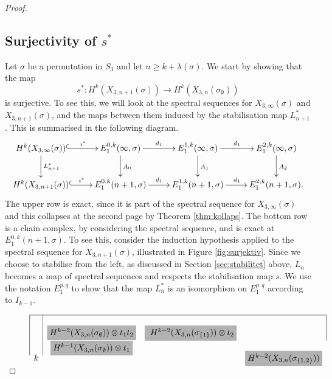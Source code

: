 \begin{proof}
  
  
  \subsection{Surjectivity of $s^*$}
  
  Let $\sigma$ be a permutation in $S_3$ and let $n \geq k +
  \lambda(\sigma)$. We start by showing that the map
  \[ s^* : H^k(X_{3,n+1}(\sigma)) \to
  H^k(X_{3,n}(\sigma_{\emptyset})) \] 
  is surjective.
  To see this, we will look at the spectral sequences for
  $X_{3,\infty}(\sigma)$ and $X_{3,n+1}(\sigma)$, and the maps between
  them induced by the stabilisation map $L^*_{n+1}$. This is
  summarised in the following diagram.
  \[ \xymatrix{ H^k(X_{3,\infty}(\sigma))
    \ar@{^(->}[r]^-{\imath^*}\ar[d]^{L^*_{n+1}} & E_1^{0,k}(\infty,\sigma)
    \ar[r]^{d_1}\ar[d]^{A_0} & 
    E_1^{1,k}(\infty,\sigma) \ar[r]^{d_1}\ar[d]^{A_1} &
    E_1^{2,k}(\infty,\sigma) \ar[d]^{A_2} \\
     H^k(X_{3,n+1}(\sigma)) \ar@{^(->}[r]^-{\imath^*} &
    E_1^{0,k}(n+1,\sigma) \ar[r]^{d_1} & E_1^{1,k}(n+1,\sigma)
    \ar[r]^{d_1} & E_1^{2,k}(n+1,\sigma).
  } \]
  The upper row is exact, since it is part of the spectral sequence for
  $X_{3,\infty}(\sigma)$ and this collapses at the second page by
  Theorem \ref{thm:kollaps}. The
  bottom row is a chain complex, by considering the spectral sequence,
  and is exact at
  $E_1^{0,k}(n+1,\sigma)$. To see this, consider the induction
  hypothesis applied to the spectral sequence for $X_{3,n+1}(\sigma)$,
  illustrated in Figure \ref{fig:surjektiv}. Since we choose to
  stabilise from the left,
  as discussed in Section \ref{sec:stabilitet} above, $L_n$
  becomes a map of spectral sequences and respects the stabilisation map
  $s$. We use the notation \colorbox{isomorphism}{$E_1^{p,q}$} to show
  that the map $L_n^*$ is an isomorphism on $E_1^{p,q}$ according to
  $I_{k-1}$. 
  \begin{figure}[ht]
    \[ 
    \begin{array}{|c|ccc|}
      \hline 
      &
      &
      &
      \\
      \multirow{6}{*}{$k$} 
      & \colorbox{isomorphism}{$H^{k-2}(X_{3,n}(\sigma_{\emptyset}))
        \otimes t_1t_2 $}
      & \colorbox{isomorphism}{ $H^{k-2}(X_{3,n}(\sigma_{\set{1}}))
        \otimes t_2 $}
      & \multirow{6}{*}{\colorbox{isomorphism}{$
        H^{k-2}(X_{3,n}(\sigma_{\set{1,2}}))$}} \\
      & \colorbox{isomorphism}{$H^{k-1}(X_{3,n}(\sigma_{\emptyset}))
        \otimes t_1$}

\end{array}\]
\end{figure}
\end{proof}
